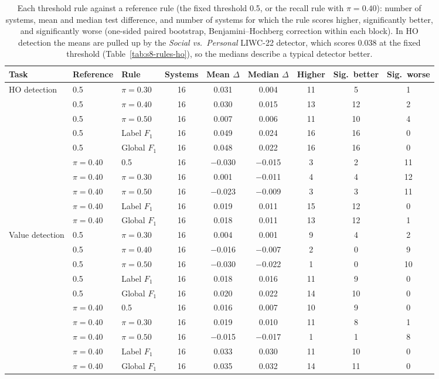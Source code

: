 \begin{table}[!htbp]
\centering
\footnotesize
\caption{Each threshold rule against a reference rule (the fixed threshold 0.5, or the recall rule with $\pi=0.40$): number of systems, mean and median test difference, and number of systems for which the rule scores higher, significantly better, and significantly worse (one-sided paired bootstrap, Benjamini--Hochberg correction within each block). In HO detection the means are pulled up by the \emph{Social vs.\ Personal} LIWC-22 detector, which scores 0.038 at the fixed threshold (Table~\ref{tab:s8-rules-ho}), so the medians describe a typical detector better.}
\label{tab:s8-rules-summary}
\begin{tabularx}{\textwidth}{llXcccccc}
\hline
\textbf{Task} & \textbf{Reference} & \textbf{Rule} & \textbf{Systems} & \textbf{Mean $\Delta$} & \textbf{Median $\Delta$} & \textbf{Higher} & \textbf{Sig.\ better} & \textbf{Sig.\ worse} \\
\hline
HO detection & 0.5 & $\pi{=}0.30$ & 16 & 0.031 & 0.004 & 11 & 5 & 1 \\
 & 0.5 & $\pi{=}0.40$ & 16 & 0.030 & 0.015 & 13 & 12 & 2 \\
 & 0.5 & $\pi{=}0.50$ & 16 & 0.007 & 0.006 & 11 & 10 & 4 \\
 & 0.5 & Label $F_1$ & 16 & 0.049 & 0.024 & 16 & 16 & 0 \\
 & 0.5 & Global $F_1$ & 16 & 0.048 & 0.022 & 16 & 16 & 0 \\
 & $\pi{=}0.40$ & 0.5 & 16 & $-$0.030 & $-$0.015 & 3 & 2 & 11 \\
 & $\pi{=}0.40$ & $\pi{=}0.30$ & 16 & 0.001 & $-$0.011 & 4 & 4 & 12 \\
 & $\pi{=}0.40$ & $\pi{=}0.50$ & 16 & $-$0.023 & $-$0.009 & 3 & 3 & 11 \\
 & $\pi{=}0.40$ & Label $F_1$ & 16 & 0.019 & 0.011 & 15 & 12 & 0 \\
 & $\pi{=}0.40$ & Global $F_1$ & 16 & 0.018 & 0.011 & 13 & 12 & 1 \\
Value detection & 0.5 & $\pi{=}0.30$ & 16 & 0.004 & 0.001 & 9 & 4 & 2 \\
 & 0.5 & $\pi{=}0.40$ & 16 & $-$0.016 & $-$0.007 & 2 & 0 & 9 \\
 & 0.5 & $\pi{=}0.50$ & 16 & $-$0.030 & $-$0.022 & 1 & 0 & 10 \\
 & 0.5 & Label $F_1$ & 16 & 0.018 & 0.016 & 11 & 9 & 0 \\
 & 0.5 & Global $F_1$ & 16 & 0.020 & 0.022 & 14 & 10 & 0 \\
 & $\pi{=}0.40$ & 0.5 & 16 & 0.016 & 0.007 & 10 & 9 & 0 \\
 & $\pi{=}0.40$ & $\pi{=}0.30$ & 16 & 0.019 & 0.010 & 11 & 8 & 1 \\
 & $\pi{=}0.40$ & $\pi{=}0.50$ & 16 & $-$0.015 & $-$0.017 & 1 & 1 & 8 \\
 & $\pi{=}0.40$ & Label $F_1$ & 16 & 0.033 & 0.030 & 11 & 10 & 0 \\
 & $\pi{=}0.40$ & Global $F_1$ & 16 & 0.035 & 0.032 & 14 & 11 & 0 \\
\hline
\end{tabularx}
\end{table}


